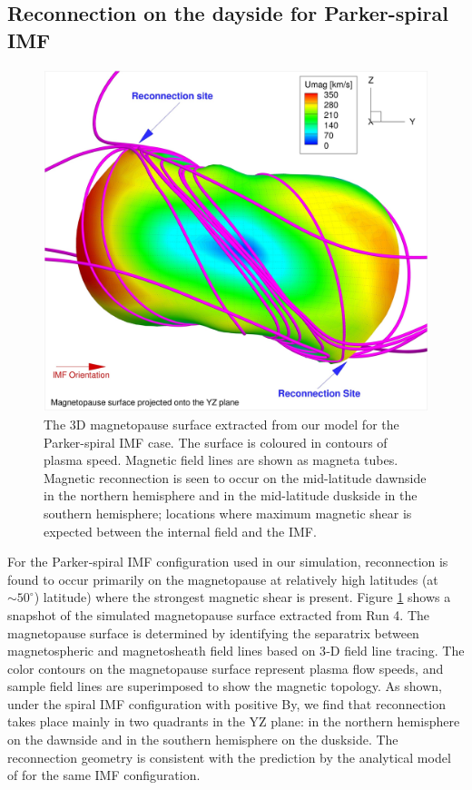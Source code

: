 \subsection{Reconnection on the dayside for Parker-spiral IMF}
\begin{figure}
    \centering
    \includegraphics[width=\textwidth]{images4/reconnection-dayside.jpg}
    \caption{The 3D magnetopause surface extracted from our model for the Parker-spiral IMF case. The surface is coloured in contours of plasma speed. Magnetic field lines are shown as magneta tubes. Magnetic reconnection is seen to occur on the mid-latitude dawnside in the northern hemisphere and in the mid-latitude duskside in the southern hemisphere; locations where maximum magnetic shear is expected between the internal field and the IMF.}
    \label{fig:reconnection-dayside}
\end{figure}

For the Parker‐spiral IMF configuration used in our simulation, reconnection is found to occur primarily on the magnetopause at relatively high latitudes (at $\sim50^\circ$) latitude) where the strongest magnetic shear is present. Figure \ref{fig:reconnection-dayside} shows a snapshot of the simulated magnetopause surface extracted from Run 4. The magnetopause surface is determined by identifying the separatrix between magnetospheric and magnetosheath field lines based on 3‐D field line tracing. The color contours on the magnetopause surface represent plasma flow speeds, and sample field lines are superimposed to show the magnetic topology. As shown, under the spiral IMF configuration with positive By, we find that reconnection takes place mainly in two quadrants in the YZ plane: in the northern hemisphere on the dawnside and in the southern hemisphere on the duskside. The reconnection geometry is consistent with the prediction by the analytical model of \cite{Masters2017} for the same IMF configuration.

